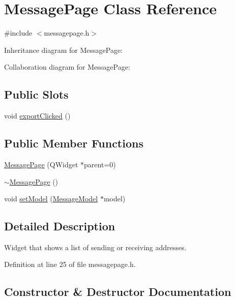 \hypertarget{class_message_page}{}\section{Message\+Page Class Reference}
\label{class_message_page}


{\ttfamily \#include $<$messagepage.\+h$>$}



Inheritance diagram for Message\+Page\+:


Collaboration diagram for Message\+Page\+:
\subsection*{Public Slots}
\begin{DoxyCompactItemize}
\item 
void \hyperlink{class_message_page_a07a42c8f15c071a62de6a6fa2e96f267}{export\+Clicked} ()
\end{DoxyCompactItemize}
\subsection*{Public Member Functions}
\begin{DoxyCompactItemize}
\item 
\hyperlink{class_message_page_ad0a8662b7ae1bdd2274a277813bf7b35}{Message\+Page} (Q\+Widget $\ast$parent=0)
\item 
\hyperlink{class_message_page_a63817b01b66bffebf44a20ee3fdb5197}{$\sim$\+Message\+Page} ()
\item 
void \hyperlink{class_message_page_ae4ba8b28922b983da1a5419365feef05}{set\+Model} (\hyperlink{class_message_model}{Message\+Model} $\ast$model)
\end{DoxyCompactItemize}


\subsection{Detailed Description}
Widget that shows a list of sending or receiving addresses. 

Definition at line 25 of file messagepage.\+h.



\subsection{Constructor \& Destructor Documentation}
\hypertarget{class_message_page_ad0a8662b7ae1bdd2274a277813bf7b35}{}
